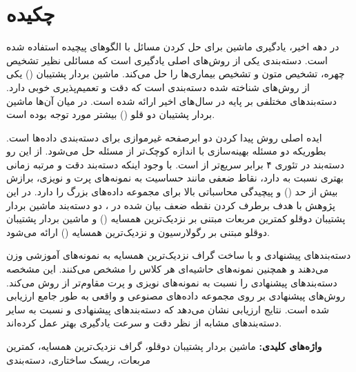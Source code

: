 
\thispagestyle{plain}

{}

\section*{چکیده}
 در دهه اخیر، یادگیری ماشین برای حل کردن مسائل با الگوهای پیچیده استفاده شده است. دسته‌بندی یکی از روش‌های اصلی یادگیری است که مسائلی نظیر تشخیص چهره، تشخیص متون و تشخیص بیماری‌ها را حل می‌کند. ماشین بردار پشتیبان  () یکی از روش‌های شناخته شده  دسته‌بندی است که دقت و تعمیم‌پذیری خوبی دارد. دسته‌بندهای مختلفی بر پایه  در سال‌های اخیر ارائه شده است. در میان آن‌ها ماشین بردار پشتیبان دو قلو () بیشتر مورد توجه بوده است.

ایده اصلی روش  پیدا کردن دو ابرصفحه غیرموازی برای دسته‌بندی داده‌ها است. بطوریکه دو مسئله بهینه‌سازی با اندازه کوچک‌تر از مسئله  حل می‌شود. از این رو دسته‌بند  در تئوری ۴ برابر سریع‌تر از  است. با وجود اینکه دسته‌بند  دقت و مرتبه زمانی بهتری نسبت به  دارد، نقاط ضعفی مانند حساسیت به نمونه‌های پرت و نویزی، برازش بیش از حد () و پیچیدگی محاسباتی بالا برای مجموعه داده‌های بزرگ را دارد.  در این پژوهش با هدف برطرف کردن نقطه ضعف بیان شده در ، دو دسته‌بند ماشین بردار پشتیبان دوقلو کمترین مربعات مبتنی بر نزدیک‌ترین همسایه () و ماشین بردار پشتیبان دوقلو مبتنی بر رگولارسیون و نزدیک‌ترین همسایه () ارائه می‌شود.  

دسته‌بندهای پیشنهادی  و  با ساخت گراف نزدیک‌ترین همسایه به نمونه‌های آموزشی وزن می‌دهند و همچنین نمونه‌های حاشیه‌ای هر کلاس را مشخص می‌کنند. این مشخصه دسته‌بندهای پیشنهادی را نسبت به نمونه‌های نویزی و پرت مقاوم‌تر از روش   می‌کند. روش‌های پیشنهادی بر روی مجموعه داده‌های مصنوعی و واقعی به طور جامع ارزیابی شده است. نتایج ارزیابی نشان می‌دهد که دسته‌بندهای پیشنهادی  و  نسبت به سایر دسته‌بندهای مشابه از نظر دقت و سرعت یادگیری بهتر عمل کرده‌اند.


\vskip 2cm
\noindent
\textbf{واژه‌های کلیدی:} 
ماشین بردار پشتیبان دوقلو، گراف نزدیک‌ترین همسایه، کمترین مربعات، ریسک ساختاری، دسته‌بندی
